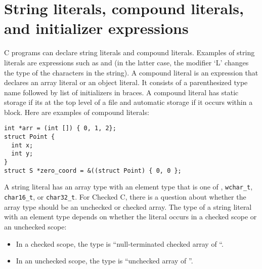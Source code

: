 \section{String literals, compound literals, and initializer expressions}

C programs can declare string literals and compound literals.  Examples
of string literals are expressions such as  and 
(in the latter case, the modifier `L' changes the type of the characters in the string).
A compound literal is an expression that declares an array literal or an object literal.
It consists of a parenthesized type name followed by list of initializers in braces.
A compound literal has static storage if its at the top level of a file and automatic
storage if it occurs within a block.  Here are examples of compound literals:
\begin{verbatim}
int *arr = (int []) { 0, 1, 2};
struct Point {
  int x;
  int y;
}
struct S *zero_coord = &((struct Point) { 0, 0 };
\end{verbatim}

A string literal has an array type with an element type that is one of ,
\verb+wchar_t+,  \verb+char16_t+, or \verb+char32_t+.   For Checked C, there is a question
about whether the array type should be an unchecked or checked array.
The type of a string literal with an element type  depends on whether the literal occurs
in a checked scope or an unchecked scope:
\begin{itemize}
\item In a checked scope, the type is ``null-terminated checked array of ``.
\item In an unchecked scope, the type is ``unchecked array of ''.
\end{itemize}

